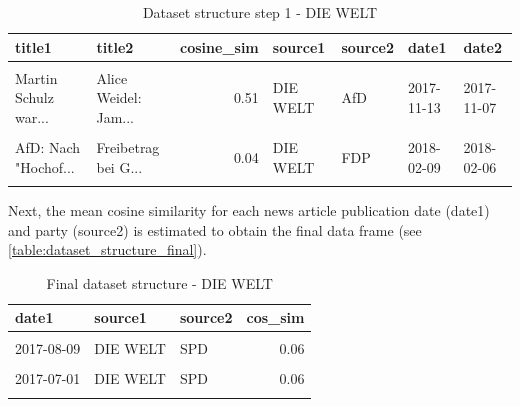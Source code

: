 \documentclass[
]{article}
\begin{document}
\begin{table}[H]

\caption{\label{tab:Dataset structure 1}Dataset structure step 1 - DIE WELT \label{table:dataset_structure1}}
\centering
\fontsize{7}{9}\selectfont
\begin{tabular}[t]{llrllll}
\toprule
title1 & title2 & cosine\_sim & source1 & source2 & date1 & date2\\
\midrule
\cellcolor{gray!6}{Grünen-Streit: Ex...} & \cellcolor{gray!6}{Werbeverbot für ...} & \cellcolor{gray!6}{0.23} & \cellcolor{gray!6}{DIE WELT} & \cellcolor{gray!6}{CDU} & \cellcolor{gray!6}{2017-12-18} & \cellcolor{gray!6}{2017-12-13}\\
Martin Schulz war... & Alice Weidel: Jam... & 0.51 & DIE WELT & AfD & 2017-11-13 & 2017-11-07\\
\cellcolor{gray!6}{Jamaika-Sondierun...} & \cellcolor{gray!6}{Ausverkauf von V...} & \cellcolor{gray!6}{0.10} & \cellcolor{gray!6}{DIE WELT} & \cellcolor{gray!6}{CDU} & \cellcolor{gray!6}{2017-11-13} & \cellcolor{gray!6}{2017-11-09}\\
AfD: Nach "Hochof... & Freibetrag bei G... & 0.04 & DIE WELT & FDP & 2018-02-09 & 2018-02-06\\
\cellcolor{gray!6}{Zu hohe Zuwanderu...} & \cellcolor{gray!6}{Soziale Sicherhei...} & \cellcolor{gray!6}{0.27} & \cellcolor{gray!6}{DIE WELT} & \cellcolor{gray!6}{B90/GRÜNE} & \cellcolor{gray!6}{2017-10-11} & \cellcolor{gray!6}{2017-10-09}\\
\bottomrule
\end{tabular}
\end{table}

Next, the mean cosine similarity for each news article publication date
(date1) and party (source2) is estimated to obtain the final data frame
(see \autoref{table:dataset_structure_final}).

\begin{table}[H]

\caption{\label{tab:Dataset structure final}Final dataset structure - DIE WELT \label{table:dataset_structure_final}}
\centering
\fontsize{7}{9}\selectfont
\begin{tabular}[t]{lllr}
\toprule
date1 & source1 & source2 & cos\_sim\\
\midrule
\cellcolor{gray!6}{2017-09-25} & \cellcolor{gray!6}{DIE WELT} & \cellcolor{gray!6}{DIE LINKE} & \cellcolor{gray!6}{0.10}\\
2017-08-09 & DIE WELT & SPD & 0.06\\
\cellcolor{gray!6}{2017-08-11} & \cellcolor{gray!6}{DIE WELT} & \cellcolor{gray!6}{DIE LINKE} & \cellcolor{gray!6}{0.22}\\
2017-07-01 & DIE WELT & SPD & 0.06\\
\cellcolor{gray!6}{2017-09-14} & \cellcolor{gray!6}{DIE WELT} & \cellcolor{gray!6}{SPD} & \cellcolor{gray!6}{0.13}\\
\bottomrule
\end{tabular}
\end{table}
\end{document}
